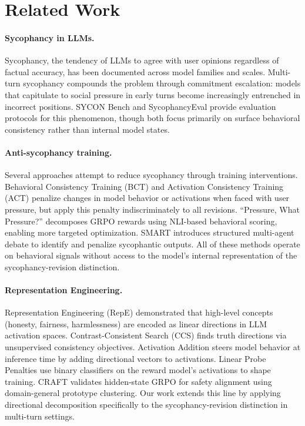 \documentclass[11pt,a4paper]{article}
\begin{document}
\section{Related Work}
\label{sec:related}

\paragraph{Sycophancy in LLMs.}
Sycophancy, the tendency of LLMs to agree with user opinions regardless of factual accuracy, has been documented across model families and scales. Multi-turn sycophancy compounds the problem through commitment escalation: models that capitulate to social pressure in early turns become increasingly entrenched in incorrect positions. SYCON Bench and SycophancyEval provide evaluation protocols for this phenomenon, though both focus primarily on surface behavioral consistency rather than internal model states.

\paragraph{Anti-sycophancy training.}
Several approaches attempt to reduce sycophancy through training interventions. Behavioral Consistency Training (BCT) and Activation Consistency Training (ACT) penalize changes in model behavior or activations when faced with user pressure, but apply this penalty indiscriminately to all revisions. ``Pressure, What Pressure?'' decomposes GRPO rewards using NLI-based behavioral scoring, enabling more targeted optimization. SMART introduces structured multi-agent debate to identify and penalize sycophantic outputs. All of these methods operate on behavioral signals without access to the model's internal representation of the sycophancy-revision distinction.

\paragraph{Representation Engineering.}
Representation Engineering (RepE) demonstrated that high-level concepts (honesty, fairness, harmlessness) are encoded as linear directions in LLM activation spaces. Contrast-Consistent Search (CCS) finds truth directions via unsupervised consistency objectives. Activation Addition steers model behavior at inference time by adding directional vectors to activations. Linear Probe Penalties use binary classifiers on the reward model's activations to shape training. CRAFT validates hidden-state GRPO for safety alignment using domain-general prototype clustering. Our work extends this line by applying directional decomposition specifically to the sycophancy-revision distinction in multi-turn settings.
\end{document}
